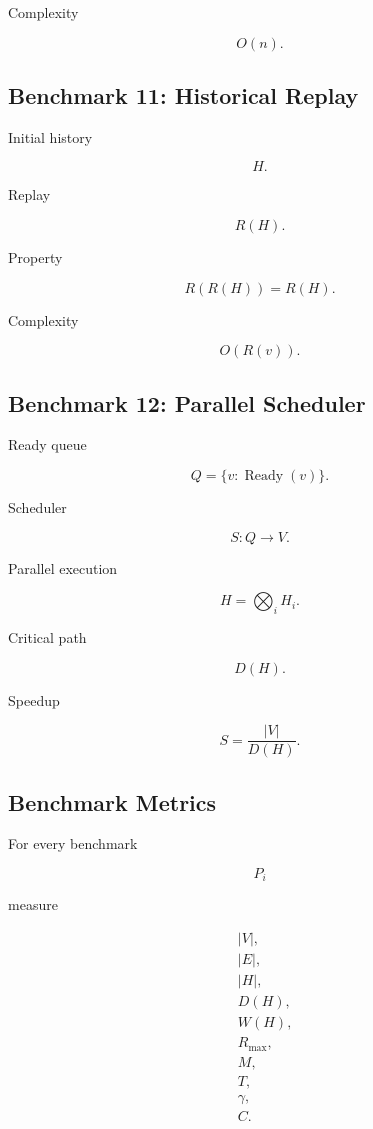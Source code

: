 \documentclass[12pt,oneside]{article}
\theoremstyle{definition}
\theoremstyle{remark}
\begin{document}
Complexity

\[
O(n).
\]

\subsection*{Benchmark 11: Historical Replay}

Initial history

\[
H.
\]

Replay

\[
R(H).
\]

Property

\[
R(R(H))
=
R(H).
\]

Complexity

\[
O(R(v)).
\]

\subsection*{Benchmark 12: Parallel Scheduler}

Ready queue

\[
Q
=
\{
v
:
\operatorname{Ready}(v)
\}.
\]

Scheduler

\[
S
:
Q
\rightarrow
V.
\]

Parallel execution

\[
H
=
\bigotimes_i
H_i.
\]

Critical path

\[
D(H).
\]

Speedup

\[
S
=
\frac{|V|}{D(H)}.
\]

\subsection*{Benchmark Metrics}

For every benchmark

\[
P_i
\]

measure

\[
\begin{aligned}
&
|V|,
\\
&
|E|,
\\
&
|H|,
\\
&
D(H),
\\
&
W(H),
\\
&
R_{\max},
\\
&
M,
\\
&
T,
\\
&
\gamma,
\\
&
C.
\end{aligned}
\]
\end{document}
